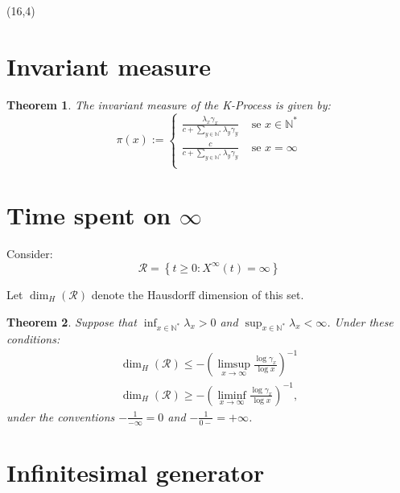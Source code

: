 \documentclass[a1,portrait]{a0poster}
\newtheorem{teorema}{Theorem}
\newcommand{\RR}{{\mathcal{R}}}
\newcommand{\Nz}{{\mathbb{N^*}}}
\begin{document}
\begin{textblock}{15}(16,4) 
  

  \section{Invariant measure}

  \begin{teorema}
    The invariant measure of the K-Process is given by:
    \begin{equation}
      \label{eq:invariante}
      \pi(x) := \begin{cases}
        \frac{\lambda_x \gamma_x}{c + \sum_{y \in \Nz} \lambda_y \gamma_y}
        & \textrm{ se } x \in \Nz \\
        \frac{c}{c + \sum_{y \in \Nz} \lambda_y \gamma_y}
        & \textrm{ se } x = \infty \\
      \end{cases}
    \end{equation}
  \end{teorema}

  \section{Time spent on $\infty$}

  Consider:
  \begin{displaymath}
    \RR = \left\{ t \geq 0: X^\infty(t) = \infty \right\}
  \end{displaymath}

  Let $\dim_H(\RR)$ denote the Hausdorff dimension of this set.

\begin{teorema}
  \label{cor:log-haus}
  Suppose that $\inf_{x \in \Nz} \lambda_x > 0$ and $\sup_{x \in \Nz}
  \lambda_x < \infty$. Under these conditions:
  \begin{gather}
    \label{eq:log-haus-sup}
    \dim_H(\RR) \leq
    - \left( \limsup_{x \to \infty} \frac{\log \gamma_x}{\log x}
    \right)^{-1} \\
    \label{eq:log-haus-inf}
    \dim_H(\RR) \geq
    - \left( \liminf_{x \to \infty} \frac{\log \gamma_x}{\log x}
    \right)^{-1},
  \end{gather}
  under the conventions $-\frac{1}{-\infty} = 0$ and $-\frac{1}{0-} =
  +\infty$.
\end{teorema}


\section{Infinitesimal generator}


\end{textblock}
\end{document}
